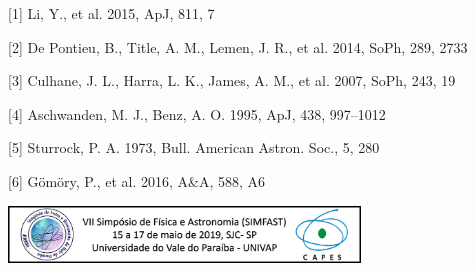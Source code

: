 \documentclass[a0paper,portrait]{baposter}
\begin{document}
\begin{poster}
{[1] Li, Y., et al. 2015, ApJ, 811, 7

[2] De Pontieu, B., Title, A. M., Lemen, J. R., et al. 2014, SoPh, 289, 2733

[3] Culhane, J. L., Harra, L. K., James, A. M., et al. 2007, SoPh, 243, 19

[4] Aschwanden, M. J., Benz, A. O. 1995, ApJ, 438, 997–1012

[5] Sturrock, P. A. 1973, Bull. American Astron. Soc., 5, 280

[6] Gömöry, P., et al. 2016, A\&A, 588, A6

}


{\begin{center}
    \includegraphics[width=0.7\textwidth]{rodape_simfast.png}
\end{center}
}


\end{poster}
\end{document}
